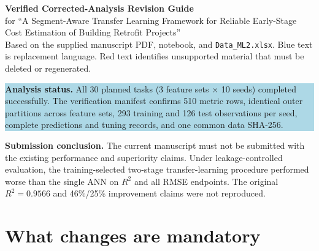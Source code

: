 \documentclass[10pt]{article}
\begin{document}
\begin{center}
{\LARGE\bfseries Verified Corrected-Analysis Revision Guide}\\[4pt]
{\large for ``A Segment-Aware Transfer Learning Framework for Reliable Early-Stage Cost Estimation of Building Retrofit Projects''}\\[6pt]
{\small Based on the supplied manuscript PDF, notebook, and \texttt{Data\_ML2.xlsx}. Blue text is replacement language. Red text identifies unsupported material that must be deleted or regenerated.}
\end{center}

\vspace{3pt}
\colorbox{lightblue}{\parbox{0.96\linewidth}{
\textbf{Analysis status.} All 30 planned tasks (3 feature sets $\times$ 10 seeds) completed successfully. The verification manifest confirms 510 metric rows, identical outer partitions across feature sets, 293 training and 126 test observations per seed, complete predictions and tuning records, and one common data SHA-256.
}}

\colorbox{lightred}{\parbox{0.96\linewidth}{
\textbf{Submission conclusion.} The current manuscript must not be submitted with the existing performance and superiority claims. Under leakage-controlled evaluation, the training-selected two-stage transfer-learning procedure performed worse than the single ANN on $R^2$ and all RMSE endpoints. The original $R^2=0.9566$ and 46\%/25\% improvement claims were not reproduced.
}}

\tableofcontents
\newpage

\section{What changes are mandatory}
\end{document}
